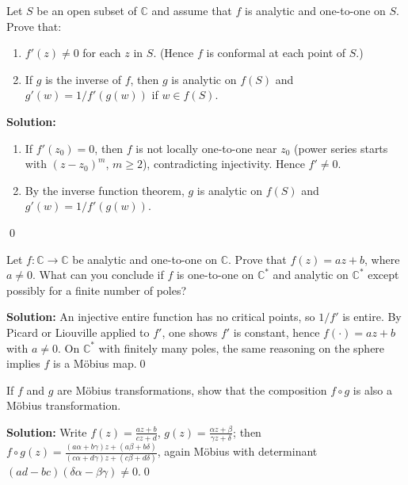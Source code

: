 \begin{problembox}
Let \( S \) be an open subset of \( \mathbb{C} \) and assume that \( f \) is analytic and one-to-one on \( S \). Prove that:
\begin{enumerate}[label=(\alph*)]
\item \( f'(z) \neq 0 \) for each \( z \) in \( S \). (Hence \( f \) is conformal at each point of \( S \).)
\item If \( g \) is the inverse of \( f \), then \( g \) is analytic on \( f(S) \) and \( g'(w) = 1 / f'(g(w)) \) if \( w \in f(S) \).
\end{enumerate}
\end{problembox}

\noindent\textbf{Solution:}
\begin{enumerate}[label=(\alph*)]
\item If $f'(z_0)=0$, then $f$ is not locally one-to-one near $z_0$ (power series starts with $(z-z_0)^m$, $m\ge2$), contradicting injectivity. Hence $f'\ne0$.
\item By the inverse function theorem, $g$ is analytic on $f(S)$ and $g'(w)=1/f'(g(w))$.
\end{enumerate}\qed


\begin{problembox}
Let \( f : \mathbb{C} \to \mathbb{C} \) be analytic and one-to-one on \( \mathbb{C} \). Prove that \( f(z) = a z + b \), where \( a \neq 0 \). What can you conclude if \( f \) is one-to-one on \( \mathbb{C}^* \) and analytic on \( \mathbb{C}^* \) except possibly for a finite number of poles?
\end{problembox}

\noindent\textbf{Solution:}
An injective entire function has no critical points, so $1/f'$ is entire. By Picard or Liouville applied to $f'$, one shows $f'$ is constant, hence $f(\cdot)=a z+b$ with $a\ne0$. On $\mathbb C^*$ with finitely many poles, the same reasoning on the sphere implies $f$ is a Möbius map.\qed


\begin{problembox}
If \( f \) and \( g \) are Möbius transformations, show that the composition \( f \circ g \) is also a Möbius transformation.
\end{problembox}

\noindent\textbf{Solution:}
Write $f(z)=\frac{a z+b}{c z+d}$, $g(z)=\frac{\alpha z+\beta}{\gamma z+\delta}$; then $f\circ g(z)=\frac{(a\alpha+b\gamma)z+(a\beta+b\delta)}{(c\alpha+d\gamma)z+(c\beta+d\delta)}$, again Möbius with determinant $(ad-bc)(\delta\alpha-\beta\gamma)\ne0$.\qed


